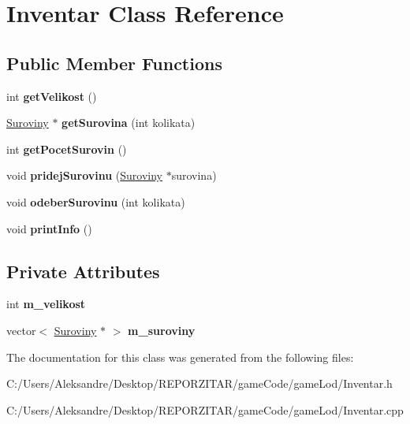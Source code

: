 \hypertarget{class_inventar}{}\section{Inventar Class Reference}
\label{class_inventar}
\subsection*{Public Member Functions}
\begin{DoxyCompactItemize}
\item 
\mbox{\label{class_inventar_a8c3d01acbf079e35ff53b67e79f5d6fc}} 
int {\bfseries get\+Velikost} ()
\item 
\mbox{\label{class_inventar_ab45d3fe983f8f3d0352da6dddf90c8e9}} 
\hyperlink{class_suroviny}{Suroviny} $\ast$ {\bfseries get\+Surovina} (int kolikata)
\item 
\mbox{\label{class_inventar_a64fab634186ee740cec673b4b8b5b2d0}} 
int {\bfseries get\+Pocet\+Surovin} ()
\item 
\mbox{\label{class_inventar_a0430386b84229c1028718d5d9ec7f1cc}} 
void {\bfseries pridej\+Surovinu} (\hyperlink{class_suroviny}{Suroviny} $\ast$surovina)
\item 
\mbox{\label{class_inventar_a21bfdb2819801071913ec63ef5a4334a}} 
void {\bfseries odeber\+Surovinu} (int kolikata)
\item 
\mbox{\label{class_inventar_a68d250cf92a9e1ab0432ac10f7df7c67}} 
void {\bfseries print\+Info} ()
\end{DoxyCompactItemize}
\subsection*{Private Attributes}
\begin{DoxyCompactItemize}
\item 
\mbox{\label{class_inventar_a9f670a57700ca91919736803d02ada1a}} 
int {\bfseries m\+\_\+velikost}
\item 
\mbox{\label{class_inventar_a551c636c6adcebf06585ea90e6929b62}} 
vector$<$ \hyperlink{class_suroviny}{Suroviny} $\ast$ $>$ {\bfseries m\+\_\+suroviny}
\end{DoxyCompactItemize}


The documentation for this class was generated from the following files\+:\begin{DoxyCompactItemize}
\item 
C\+:/\+Users/\+Aleksandre/\+Desktop/\+R\+E\+P\+O\+R\+Z\+I\+T\+A\+R/game\+Code/game\+Lod/Inventar.\+h\item 
C\+:/\+Users/\+Aleksandre/\+Desktop/\+R\+E\+P\+O\+R\+Z\+I\+T\+A\+R/game\+Code/game\+Lod/Inventar.\+cpp\end{DoxyCompactItemize}
